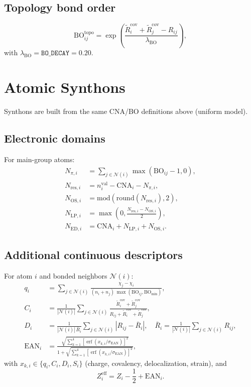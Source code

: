 \documentclass[a4paper,11pt]{article}
\begin{document}
\subsection{Topology bond order}
\begin{equation}
\mathrm{BO}_{ij}^{\mathrm{topo}}
=\exp\!\left(
\frac{\tilde R^{\mathrm{cov}}_i+\tilde R^{\mathrm{cov}}_j-R_{ij}}{\lambda_{\mathrm{BO}}}
\right),
\end{equation}
with $\lambda_{\mathrm{BO}}=\texttt{BO\_DECAY}=0.20$.

\section{Atomic Synthons}
Synthons are built from the same CNA/BO definitions above (uniform model).

\subsection{Electronic domains}
For main-group atoms:
\begin{align}
N_{\pi,i} &= \sum_{j\in\mathcal{N}(i)} \max(\mathrm{BO}_{ij}-1,0),\\
N_{\mathrm{res},i} &= n^{\mathrm{val}}_i-\mathrm{CNA}_i-N_{\pi,i},\\
N_{\mathrm{OS},i} &= \mathrm{mod}\!\left(\mathrm{round}(N_{\mathrm{res},i}),2\right),\\
N_{\mathrm{LP},i} &= \max\!\left(0,\frac{N_{\mathrm{res},i}-N_{\mathrm{OS},i}}{2}\right),\\
N_{\mathrm{ED},i} &= \mathrm{CNA}_i+N_{\mathrm{LP},i}+N_{\mathrm{OS},i}.
\end{align}

\subsection{Additional continuous descriptors}
For atom $i$ and bonded neighbors $\mathcal{N}(i)$:
\begin{align}
q_i &= \sum_{j\in\mathcal{N}(i)}
\frac{\chi_j-\chi_i}{(n_i+n_j)\,\max(\mathrm{BO}_{ij},\mathrm{BO}_{\min})},\\
C_i &= \frac{1}{|\mathcal{N}(i)|}\sum_{j\in\mathcal{N}(i)}
\frac{\tilde R^{\mathrm{cov}}_i+\tilde R^{\mathrm{cov}}_j}
{R_{ij}+\tilde R^{\mathrm{cov}}_i+\tilde R^{\mathrm{cov}}_j},\\
D_i &= \frac{1}{|\mathcal{N}(i)|\,\bar R_i}\sum_{j\in\mathcal{N}(i)}\left|R_{ij}-\bar R_i\right|,
\quad
\bar R_i=\frac{1}{|\mathcal{N}(i)|}\sum_{j\in\mathcal{N}(i)}R_{ij},\\
\mathrm{EAN}_i &= \frac{\sqrt{\sum_{k=1}^{4}\left[\operatorname{erf}(x_{k,i}/\sigma_{\mathrm{EAN}})\right]^2}}
{1+\sqrt{\sum_{k=1}^{4}\left[\operatorname{erf}(x_{k,i}/\sigma_{\mathrm{EAN}})\right]^2}},
\end{align}
with $x_{k,i}\in\{q_i,C_i,D_i,S_i\}$ (charge, covalency, delocalization, strain), and
\begin{equation}
Z^{\mathrm{eff}}_i = Z_i-\frac{1}{2}+\mathrm{EAN}_i.
\end{equation}
\end{document}
